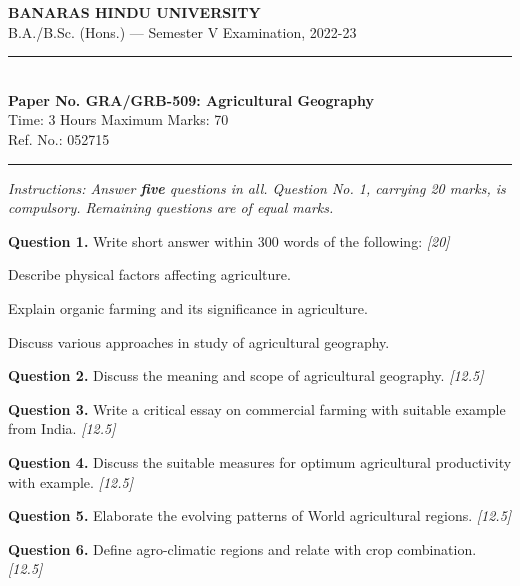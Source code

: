 \documentclass[11pt,a4paper]{article}
\newcommand{\pts}[1]{\hfill   \textit{[#1]}}
\begin{document}
\begin{center}
  {\large\bfseries BANARAS HINDU UNIVERSITY}\\[2pt]
  {\normalsize B.A./B.Sc. (Hons.) --- Semester V Examination, 2022-23}\\[6pt]
  \rule{0.8\linewidth}{0.5pt}\\[6pt]
  {\large\bfseries Paper No. GRA/GRB-509: Agricultural Geography}\\[4pt]
  {\normalsize Time: 3 Hours \hfill Maximum Marks: 70}\\[2pt]
  {\small Ref. No.: 052715}
\end{center}
\rule{\linewidth}{0.4pt}
\smallskip



\noindent   \textit{Instructions: Answer   \textbf{five} questions in all. Question No. 1, carrying 20 marks, is compulsory. Remaining questions are of equal marks.}
\bigskip




\noindent   \textbf{Question 1.} Write short answer within 300 words of the following: \pts{20}

\begin{parts}
  \item Describe physical factors affecting agriculture.
  \item Explain organic farming and its significance in agriculture.
  \item Discuss various approaches in study of agricultural geography.
\end{parts}

\medskip


\noindent   \textbf{Question 2.} Discuss the meaning and scope of agricultural geography. \pts{12.5}

\medskip


\noindent   \textbf{Question 3.} Write a critical essay on commercial farming with suitable example from India. \pts{12.5}

\medskip


\noindent   \textbf{Question 4.} Discuss the suitable measures for optimum agricultural productivity with example. \pts{12.5}

\medskip


\noindent   \textbf{Question 5.} Elaborate the evolving patterns of World agricultural regions. \pts{12.5}

\medskip


\noindent   \textbf{Question 6.} Define agro-climatic regions and relate with crop combination. \pts{12.5}
\end{document}
